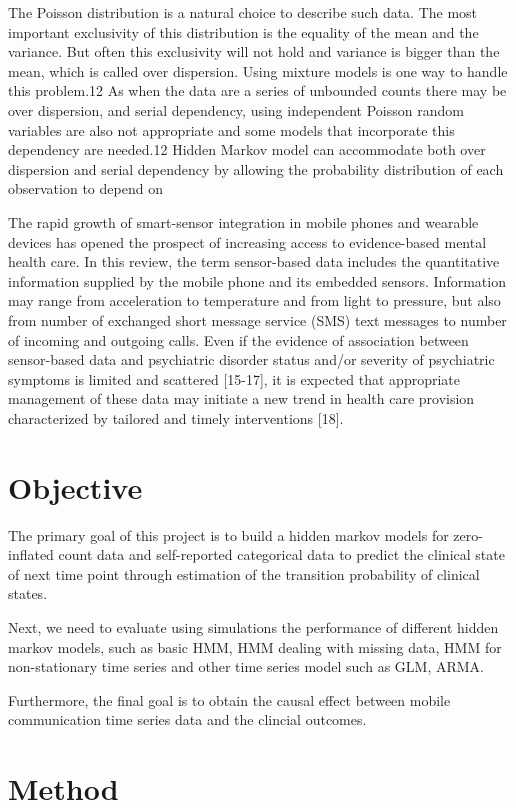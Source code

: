 \documentclass[12pt]{article}
\numberwithin{equation}{section}
\begin{document}
The Poisson distribution is a natural choice to describe such data. The most important exclusivity of this distribution is the equality of the mean and the variance. But often this exclusivity will not hold and variance is bigger than the mean, which is called over dispersion. Using mixture models is one way to handle this problem.12 As when the data are a series of unbounded counts there may be over dispersion, and serial dependency, using independent Poisson random variables are also not appropriate and some models that incorporate this dependency are needed.12
Hidden Markov model can accommodate both over dispersion and serial dependency by allowing the probability distribution of each observation to depend on


The rapid growth of smart-sensor integration in mobile phones and wearable devices has opened the prospect of increasing access to evidence-based mental health care.  
In this review, the term sensor-based data includes the quantitative information supplied by the mobile phone and its embedded sensors. Information may range from acceleration to temperature and from light to pressure, but also from number of exchanged short message service (SMS) text messages to number of incoming and outgoing calls. 
Even if the evidence of association between sensor-based data and psychiatric disorder status and/or severity of psychiatric symptoms is limited and scattered [15-17], it is expected that appropriate management of these data may initiate a new trend in health care provision characterized by tailored and timely interventions [18].


\section{Objective}

The primary goal of this project is to build a hidden markov models for zero-inflated count data and self-reported categorical data to predict the clinical state of next time point through estimation of the transition probability of clinical states.

Next, we need to evaluate using simulations the performance of different hidden markov models, such as basic HMM, HMM dealing with missing data, HMM for non-stationary time series and other time series model such as GLM, ARMA.

Furthermore, the final goal is to obtain the causal effect between mobile communication time series data and the clincial outcomes.

\section{Method}


\end{document}
